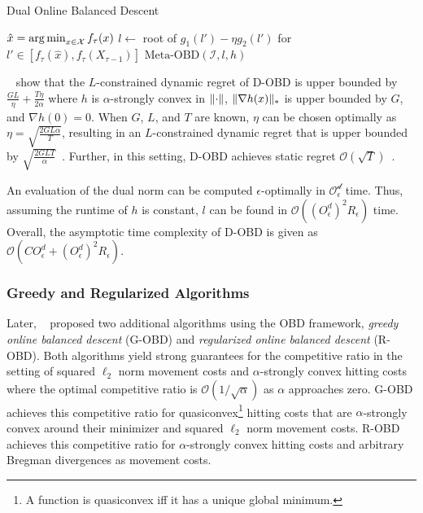 \begin{algorithm}
    \caption{Dual Online Balanced Descent~\cite{Chen2018}}\label{alg:md:dobd}
    $\hat{x} = \operatorname*{arg\,min}_{x \in \mathcal{X}} f_{\tau}(x)$\;
    $l \gets $ root of $g_1(l') - \eta g_2(l')$ for $l' \in [f_{\tau}(\hat{x}), f_{\tau}(X_{\tau-1})]$\;
    \Return $\text{Meta-OBD}(\mathcal{I}, l, h)$\;
\end{algorithm}

\citeauthor*{Chen2018}~\cite{Chen2018} show that the $L$-constrained dynamic regret of D-OBD is upper bounded by $\frac{G L}{\eta} + \frac{T \eta}{2 \alpha}$ where $h$ is $\alpha$-strongly convex in $\lVert\cdot\rVert$, $\lVert\nabla h(x)\rVert_*$ is upper bounded by $G$, and $\nabla h(0) = 0$. When $G$, $L$, and $T$ are known, $\eta$ can be chosen optimally as $\eta = \sqrt{\frac{2 G L \alpha}{T}}$, resulting in an $L$-constrained dynamic regret that is upper bounded by $\sqrt{\frac{2 G L T}{\alpha}}$~\cite{Chen2018}. Further, in this setting, D-OBD achieves static regret $\mathcal{O}(\sqrt{T})$~\cite{Chen2018}.

An evaluation of the dual norm can be computed $\epsilon$-optimally in $\mathcal{O_{\epsilon}^d}$ time. Thus, assuming the runtime of $h$ is constant, $l$ can be found in $\mathcal{O}((O_{\epsilon}^d)^2 R_{\epsilon})$ time. Overall, the asymptotic time complexity of D-OBD is given as $\mathcal{O}(C O_{\epsilon}^d + (O_{\epsilon}^d)^2 R_{\epsilon})$.

\subsubsection{Greedy and Regularized Algorithms}

Later, \citeauthor*{Goel2019}~\cite{Goel2019} proposed two additional algorithms using the OBD framework, \emph{greedy online balanced descent} (G-OBD) and \emph{regularized online balanced descent} (R-OBD). Both algorithms yield strong guarantees for the competitive ratio in the setting of squared $\ell_2$ norm movement costs and $\alpha$-strongly convex hitting costs where the optimal competitive ratio is $\mathcal{O}(1 / \sqrt{\alpha})$ as $\alpha$ approaches zero. G-OBD achieves this competitive ratio for quasiconvex\footnote{A function is quasiconvex iff it has a unique global minimum.} hitting costs that are $\alpha$-strongly convex around their minimizer and squared $\ell_2$ norm movement costs. R-OBD achieves this competitive ratio for $\alpha$-strongly convex hitting costs and arbitrary Bregman divergences as movement costs.

